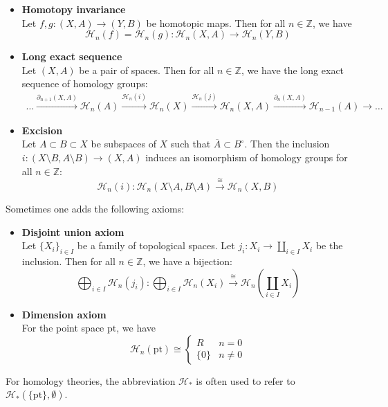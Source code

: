 \documentclass[a4paper,11pt]{article}
\begin{document}
\begin{definition}
    \begin{itemize}
        \item \textbf{Homotopy invariance}\\
        Let \(f,g:(X,A)\to(Y,B)\) be homotopic maps. Then for all \(n\in\mathbb{Z}\), we have
        \[\mathcal{H}_n(f)=\mathcal{H}_n(g):\mathcal{H}_n(X,A)\to\mathcal{H}_n(Y,B)\]
        \item \textbf{Long exact sequence}\\
        Let \((X,A)\) be a pair of spaces. Then for all \(n\in\mathbb{Z}\), we have the long exact sequence of homology groups:
        \begin{align*}
            \dots\xrightarrow{\partial_{n+1}(X,A)}\mathcal{H}_n(A)\xrightarrow{\mathcal{H}_n(i)}\mathcal{H}_n(X)\xrightarrow{\mathcal{H}_n(j)}\mathcal{H}_n(X,A)\xrightarrow{\partial_n(X,A)}\mathcal{H}_{n-1}(A)\to\dots
        \end{align*}
        \item \textbf{Excision}\\
        Let \(A\subset B\subset X\) be subspaces of \(X\) such that \(\overline{A}\subset B^\circ\). Then the inclusion \(i:(X\setminus B,A\setminus B)\to(X,A)\) induces an isomorphism of homology groups for all \(n\in\mathbb{Z}\):
        \[\mathcal{H}_n(i):\mathcal{H}_n(X\setminus A, B\setminus A)\xrightarrow{\cong}\mathcal{H}_n(X,B)\]
    \end{itemize}
    Sometimes one adds the following axioms:
    \begin{itemize}
        \item \textbf{Disjoint union axiom}\\
        Let \({\{X_i\}}_{i\in I}\) be a family of topological spaces. Let \(j_i:X_i\to\coprod_{i\in I}X_i\) be the inclusion. Then for all \(n\in\mathbb{Z}\), we have a bijection:
        \[\bigoplus_{i\in I}\mathcal{H}_n(j_i):\bigoplus_{i\in I}\mathcal{H}_n(X_i)\xrightarrow{\cong}\mathcal{H}_n\left(\coprod_{i\in I}X_i\right)\]
        \item \textbf{Dimension axiom}\\
        For the point space \(\mathrm{pt}\), we have
        \[\mathcal{H}_n(\mathrm{pt})\cong\begin{cases}R&n=0\\\{0\}&n\neq0\end{cases}\]
        
    \end{itemize}
    For homology theories, the abbreviation \(\mathcal{H}_\ast\) is often used to refer to \(\mathcal{H}_\ast(\{\mathrm{pt}\},\emptyset)\).
\end{definition}
\end{document}

